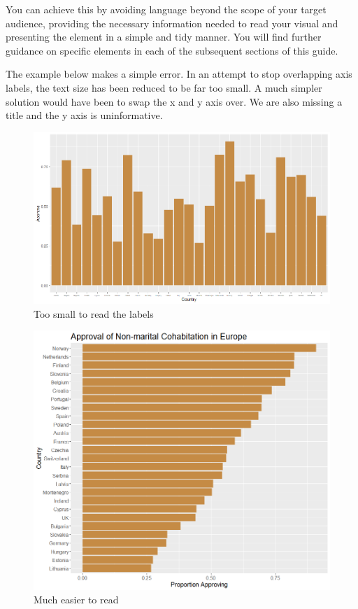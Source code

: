 \documentclass[
]{book}
\begin{document}
You can achieve this by avoiding language beyond the scope of your target audience, providing the necessary information needed to read your visual and presenting the element in a simple and tidy manner. You will find further guidance on specific elements in each of the subsequent sections of this guide.

The example below makes a simple error. In an attempt to stop overlapping axis labels, the text size has been reduced to be far too small. A much simpler solution would have been to swap the x and y axis over. We are also missing a title and the y axis is uninformative.

\begin{figure}
\centering
\includegraphics{img/bar chart poor.png}
\caption{Too small to read the labels}
\end{figure}

\begin{figure}
\centering
\includegraphics{img/order restored.png}
\caption{Much easier to read}
\end{figure}
\end{document}

